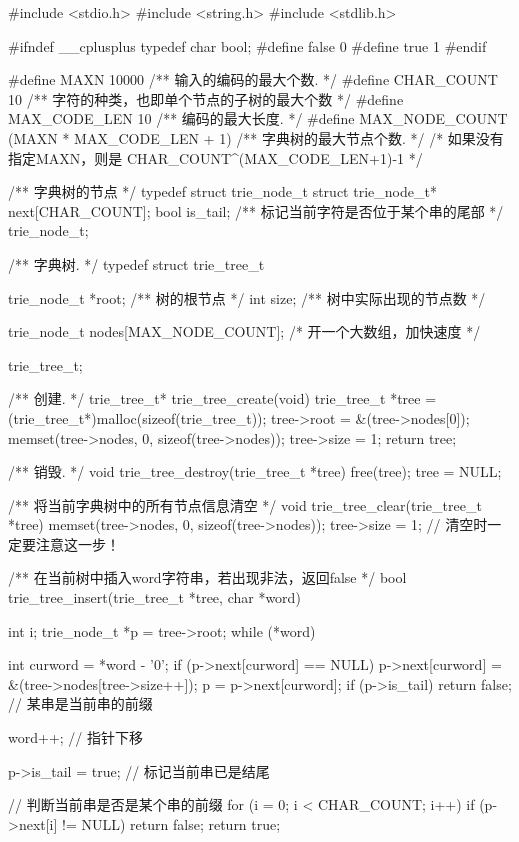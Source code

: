 \begin{Codex}[label=trie_tree.c]
#include <stdio.h>
#include <string.h>
#include <stdlib.h>

#ifndef __cplusplus
typedef char bool;
#define false 0
#define true 1
#endif

#define MAXN 10000   /** 输入的编码的最大个数. */
#define CHAR_COUNT  10 /** 字符的种类，也即单个节点的子树的最大个数 */
#define MAX_CODE_LEN 10 /** 编码的最大长度. */
#define MAX_NODE_COUNT  (MAXN * MAX_CODE_LEN + 1)  /** 字典树的最大节点个数. */
                   /* 如果没有指定MAXN，则是 CHAR_COUNT^(MAX_CODE_LEN+1)-1 */

/** 字典树的节点 */
typedef struct trie_node_t {
    struct trie_node_t* next[CHAR_COUNT];
    bool is_tail; /** 标记当前字符是否位于某个串的尾部 */
} trie_node_t;

/** 字典树. */
typedef struct trie_tree_t {
    trie_node_t *root; /** 树的根节点 */
    int size; /** 树中实际出现的节点数 */

    trie_node_t nodes[MAX_NODE_COUNT]; /* 开一个大数组，加快速度 */
} trie_tree_t;

/** 创建. */
trie_tree_t* trie_tree_create(void) {
    trie_tree_t *tree = (trie_tree_t*)malloc(sizeof(trie_tree_t));
    tree->root = &(tree->nodes[0]);
    memset(tree->nodes, 0, sizeof(tree->nodes));
    tree->size = 1;
    return tree;
}

/** 销毁. */
void trie_tree_destroy(trie_tree_t *tree) {
    free(tree);
    tree = NULL;
}

/** 将当前字典树中的所有节点信息清空 */
void trie_tree_clear(trie_tree_t *tree) {
    memset(tree->nodes, 0, sizeof(tree->nodes));
    tree->size = 1; // 清空时一定要注意这一步！
}

/** 在当前树中插入word字符串，若出现非法，返回false */
bool trie_tree_insert(trie_tree_t *tree, char *word) {
    int i;
    trie_node_t *p = tree->root;
    while (*word) {
        int curword = *word - '0';
        if (p->next[curword] == NULL) {
            p->next[curword] = &(tree->nodes[tree->size++]);
        }
        p = p->next[curword];
        if (p->is_tail) return false; // 某串是当前串的前缀

        word++; // 指针下移
    }

    p->is_tail = true; // 标记当前串已是结尾

    // 判断当前串是否是某个串的前缀
    for (i = 0; i < CHAR_COUNT; i++)
        if (p->next[i] != NULL)
            return false;
    return true;
}
\end{Codex}


